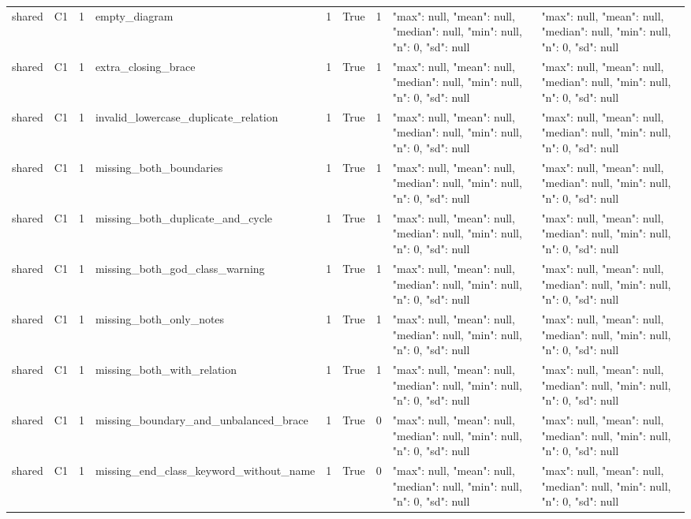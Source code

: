 \begin{tabular}{lllllllll}
shared & C1 & 1 & empty\_diagram & 1 & True & 1 & {"max": null, "mean": null, "median": null, "min": null, "n": 0, "sd": null} & {"max": null, "mean": null, "median": null, "min": null, "n": 0, "sd": null} \\
shared & C1 & 1 & extra\_closing\_brace & 1 & True & 1 & {"max": null, "mean": null, "median": null, "min": null, "n": 0, "sd": null} & {"max": null, "mean": null, "median": null, "min": null, "n": 0, "sd": null} \\
shared & C1 & 1 & invalid\_lowercase\_duplicate\_relation & 1 & True & 1 & {"max": null, "mean": null, "median": null, "min": null, "n": 0, "sd": null} & {"max": null, "mean": null, "median": null, "min": null, "n": 0, "sd": null} \\
shared & C1 & 1 & missing\_both\_boundaries & 1 & True & 1 & {"max": null, "mean": null, "median": null, "min": null, "n": 0, "sd": null} & {"max": null, "mean": null, "median": null, "min": null, "n": 0, "sd": null} \\
shared & C1 & 1 & missing\_both\_duplicate\_and\_cycle & 1 & True & 1 & {"max": null, "mean": null, "median": null, "min": null, "n": 0, "sd": null} & {"max": null, "mean": null, "median": null, "min": null, "n": 0, "sd": null} \\
shared & C1 & 1 & missing\_both\_god\_class\_warning & 1 & True & 1 & {"max": null, "mean": null, "median": null, "min": null, "n": 0, "sd": null} & {"max": null, "mean": null, "median": null, "min": null, "n": 0, "sd": null} \\
shared & C1 & 1 & missing\_both\_only\_notes & 1 & True & 1 & {"max": null, "mean": null, "median": null, "min": null, "n": 0, "sd": null} & {"max": null, "mean": null, "median": null, "min": null, "n": 0, "sd": null} \\
shared & C1 & 1 & missing\_both\_with\_relation & 1 & True & 1 & {"max": null, "mean": null, "median": null, "min": null, "n": 0, "sd": null} & {"max": null, "mean": null, "median": null, "min": null, "n": 0, "sd": null} \\
shared & C1 & 1 & missing\_boundary\_and\_unbalanced\_brace & 1 & True & 0 & {"max": null, "mean": null, "median": null, "min": null, "n": 0, "sd": null} & {"max": null, "mean": null, "median": null, "min": null, "n": 0, "sd": null} \\
shared & C1 & 1 & missing\_end\_class\_keyword\_without\_name & 1 & True & 0 & {"max": null, "mean": null, "median": null, "min": null, "n": 0, "sd": null} & {"max": null, "mean": null, "median": null, "min": null, "n": 0, "sd": null} \\

\end{tabular}
